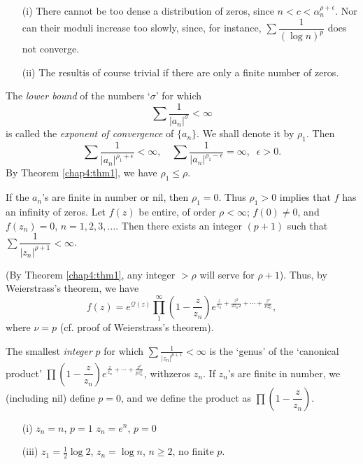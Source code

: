 \begin{remark*}
\begin{itemize}
\item[(i)] There cannot be too dense a distribution of zeros, since $n
  < c < \alpha^{\rho + \epsilon}_n$. Nor can their moduli increase
  too slowly, since, for instance, $\sum\dfrac{1}{(\log n)^p}$ does
  not converge.

\item[(ii)] The result\pageoriginale is of course trivial if there are
  only a finite number of zeros.
\end{itemize}
\end{remark*}

\begin{defi*}
The {\em lower bound} of the numbers `$\sigma$' for which
$$
\sum\dfrac{1}{|a_n|^{\sigma}} < \infty
$$ 
is called the {\em exponent of
  convergence} of $\{a_n\}$. We shall denote it by $\rho_1$.
Then 
$$ 
\sum \frac{1}{|a_n|^{\rho_1 + \epsilon}} < \infty, \quad \sum
\frac{1}{|a_n|^{\rho_1 - \epsilon}} = \infty, \;\; \epsilon >0.
$$
By Theorem \ref{chap4:thm1}, we have $\rho_1 \leq \rho$.
\end{defi*}

\medskip
{} If the $a_n$'s are finite in number or nil,
then $\rho_1 =0$. Thus $\rho_1 >0$ implies that $f$ has an infinity of
zeros. Let $f(z)$ be entire, of order $\rho < \infty$; $f(0) \neq 0$,
and $f(z_n) =0$, $n = 1,2,3, \ldots$. Then there exists an integer
$(p+1)$ such that $\sum \dfrac{1}{|z_n|^{\rho+1}} < \infty$.

(By Theorem \ref{chap4:thm1}, any integer $> \rho$ will serve for $\rho+1$). Thus, by
Weierstrass's theorem, we have
$$
f(z) = e^{\mathcal{Q}(z)} \prod\limits^{\infty}_1
\left(1-\frac{z}{z_n} \right) e^{\frac{z}{z_n} + \frac{z^2}{2z_n2} +
  \cdots + \frac{z^\nu}{\nu z^\nu_n}}, 
$$
where $\nu = p$ (cf. proof of Weierstrass's theorem).

\begin{defi*}
The smallest {\em integer} $p$ for which $\sum \frac{1}{|z_n|^{p+1}}
< \infty$ is the 
`genus' of the `canonical product' $\prod \left(1-\dfrac{z}{z_n}
\right)e^{\frac{z}{z_n} + \cdots + \frac{z^p}{pz^p_n}}$, 
with\pageoriginale zeros $z_n$. If $z_n$'s are finite in
number, we (including nil) define $p=0$, and we define the product as
$\prod\left(1-\dfrac{z}{z_n} \right)$.
\end{defi*}

\begin{examples*}
\begin{itemize}
\item[{\rm (i)}] $z_n = n$, $p=1$  $z_n = e^n$, $p =0$

\smallskip

\item[{\rm (iii)}] $z_1 = \frac{1}{2} \log 2$, $z_n = \log n$, $n \geq 2$, no
finite $p$.
\end{itemize}
\end{examples*}


